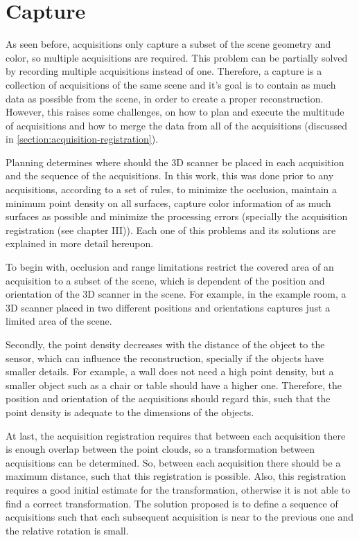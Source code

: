 \section{Capture}
\label{section:capture}

As seen before, acquisitions only capture a subset of the scene geometry and color, so multiple acquisitions are required. This problem can be partially solved by recording multiple acquisitions instead of one. Therefore, a capture is a collection of acquisitions of the same scene and it's goal is to contain as much data as possible from the scene, in order to create a proper reconstruction. However, this raises some challenges, on how to plan and execute the multitude of acquisitions and how to merge the data from all of the acquisitions (discussed in \cref{section:acquisition-registration}).

Planning determines where should the 3D scanner be placed in each acquisition and the sequence of the acquisitions. In this work, this was done prior to any acquisitions, according to a set of rules, to minimize the occlusion, maintain a minimum point density on all surfaces, capture color information of as much surfaces as possible and minimize the processing errors (specially the acquisition registration (see chapter III)). Each one of this problems and its solutions are explained in more detail hereupon.

To begin with, occlusion and range limitations restrict the covered area of an acquisition to a subset of the scene, which is dependent of the position and orientation of the 3D scanner in the scene. For example, in the example room, a 3D scanner placed in two different positions and orientations captures just a limited area of the scene.

Secondly, the point density decreases with the distance of the object to the sensor, which can influence the reconstruction, specially if the objects have smaller details. For example, a wall does not need a high point density, but a smaller object such as a chair or table should have a higher one. Therefore, the position and orientation of the acquisitions should regard this, such that the point density is adequate to the dimensions of the objects.

At last, the acquisition registration requires that between each acquisition there is enough overlap between the point clouds, so a transformation between acquisitions can be determined. So, between each acquisition there should be a maximum distance, such that this registration is possible. Also, this registration requires a good initial estimate for the transformation, otherwise it is not able to find a correct transformation. The solution proposed is to define a sequence of acquisitions such that each subsequent acquisition is near to the previous one and the relative rotation is small.

